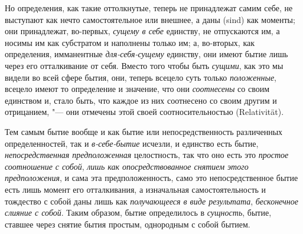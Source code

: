 Но определения, как такие оттолкнутые, теперь не принадлежат самим себе, не
выступают как нечто самостоятельное или внешнее, а даны (sind) как моменты;
они принадлежат, во-первых, {\em сущему в себе}
единству, не отпускаются им, а носимы им как субстратом и наполнены только
им; а, во-вторых, как определения, имманентные
{\em для-себя-сущему} единству, они имеют бытие лишь
через его отталкивание от себя. Вместо того чтобы быть
{\em сущими}, как это мы видели во всей сфере бытия,
они, теперь всецело суть только {\em положенные},
всецело имеют то определение и значение, что они
{\em соотнесены} со своим единством и, стало быть, что
каждое из них соотнесено со своим другим и отрицанием, "--- они отмечены этой
своей соотносительностью (Relativität).

Тем самым бытие вообще и как бытие или непосредственность различенных
определенностей, так и {\em в-себе-бытие} исчезли, и
единство есть бытие, {\em непосредственная
предположенная} целостность, так что оно есть это
{\em простое соотношение с собой},
{\em лишь как опосредствованное снятием этого
предположения}, и сама эта предположенность, само это непосредственное
бытие есть лишь момент его отталкивания, а изначальная самостоятельность и
тождество с собой даны лишь как {\em получающееся в
виде результата}, {\em бесконечное слияние с собой}.
Таким образом, бытие определилось в {\em сущность},
бытие, ставшее через снятие бытия простым, однородным с собой бытием.
